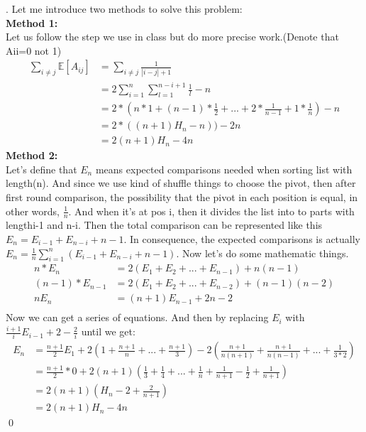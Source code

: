\documentclass[12pt, notitlepage]{article}
\newenvironment{sol}
  {\par\vspace{3mm}\noindent{\it Solution}.}{\qed}
\begin{document}
\begin{sol}
Let me introduce two methods to solve this problem:\\
\textbf{Method 1:}\\
Let us follow the step we use in class but do more precise work.(Denote that Aii=0 not 1)
\begin{align*}
\sum_{i\neq j}^{}\mathbb{E}[A_{ij}]&=\sum_{i\neq j}^{}\frac{1}{|i-j|+1}\\
&=2\sum_{i=1}^{n}\sum_{l=1}^{n-i+1}\frac{1}{l}-n\\
&=2*(n*1+(n-1)*\frac{1}{2}+...+2*\frac{1}{n-1}+1*\frac{1}{n})-n\\
&=2*((n+1)H_n-n))-2n\\
&=2(n+1)H_n-4n
\end{align*}
\textbf{Method 2:}\\
Let's define that $E_n$ means expected comparisons needed when sorting list with length(n). And since we use kind of shuffle things to choose the pivot, then after  first round comparison, the possibility that the pivot in each position is equal, in other words, $\frac{1}{n}$. And when it's at pos i, then it divides the list into to parts with length{i-1} and {n-i}. Then the total comparison can be represented like this $E_n = E_{i-1}+E_{n-i}+n-1$. In consequence, the expected comparisons is actually $E_n=\frac{1}{n}\sum_{i=1}^{n}(E_{i-1}+E_{n-i}+n-1)$. Now let's do some mathematic things.
\begin{align*}
n*E_n&=2(E_1+E_2+...+E_{n-1})+n(n-1) \tag{1}\\
(n-1)*E_{n-1}&=2(E_1+E_2+...+E_{n-2})+(n-1)(n-2) \tag{2}\\
nE_n&=(n+1)E_{n-1}+2n-2 \tag{(1)-(2)}\\
\end{align*}
Now we can get a series of equations. And then by replacing $E_i$ with $\frac{i+1}{i}E_{i-1}+2-\frac{2}{i}$ until we get:
\begin{align*}
E_n&=\frac{n+1}{2}E_{1}+2(1+\frac{n+1}{n}+...+\frac{n+1}{3})-2(\frac{n+1}{n(n+1)}+\frac{n+1}{n(n-1)}+...+\frac{1}{3*2})\\
&=\frac{n+1}{2}*0+2(n+1)(\frac{1}{3}+\frac{1}{4}+...+\frac{1}{n}+\frac{1}{n+1}-\frac{1}{2}+\frac{1}{n+1})\\
&=2(n+1)(H_n-2+\frac{2}{n+1})\\
&=2(n+1)H_n-4n
\end{align*}
\end{sol}
\end{document}
